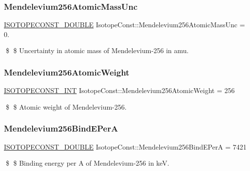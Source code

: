 \subsubsection{\texorpdfstring{Mendelevium256\+Atomic\+Mass\+Unc}{Mendelevium256AtomicMassUnc}}
{\footnotesize\ttfamily \mbox{\hyperlink{group___isotope_const-_macros_ga8f45a7272ce02c0b4c65c44636ed719a}{I\+S\+O\+T\+O\+P\+E\+C\+O\+N\+S\+T\+\_\+\+D\+O\+U\+B\+LE}} Isotope\+Const\+::\+Mendelevium256\+Atomic\+Mass\+Unc = 0.}

\$ \$ Uncertainty in atomic mass of Mendelevium-\/256 in amu. \mbox{\label{group___isotope_const-_mendelevium-_md256_gac8668fa2a30b4dfa1bcdd213db01b2aa}} 
\subsubsection{\texorpdfstring{Mendelevium256\+Atomic\+Weight}{Mendelevium256AtomicWeight}}
{\footnotesize\ttfamily \mbox{\hyperlink{group___isotope_const-_macros_ga5f18360b3e99483a35c32d789e62621c}{I\+S\+O\+T\+O\+P\+E\+C\+O\+N\+S\+T\+\_\+\+I\+NT}} Isotope\+Const\+::\+Mendelevium256\+Atomic\+Weight = 256}

\$ \$ Atomic weight of Mendelevium-\/256. \mbox{\label{group___isotope_const-_mendelevium-_md256_ga3edebbebf8acb86dc08d62b814d1826b}} 
\subsubsection{\texorpdfstring{Mendelevium256\+Bind\+E\+PerA}{Mendelevium256BindEPerA}}
{\footnotesize\ttfamily \mbox{\hyperlink{group___isotope_const-_macros_ga8f45a7272ce02c0b4c65c44636ed719a}{I\+S\+O\+T\+O\+P\+E\+C\+O\+N\+S\+T\+\_\+\+D\+O\+U\+B\+LE}} Isotope\+Const\+::\+Mendelevium256\+Bind\+E\+PerA = 7421}

\$ \$ Binding energy per A of Mendelevium-\/256 in keV. \mbox{\label{group___isotope_const-_mendelevium-_md256_ga6c8a5efb5350b979f432784de752db47}} 

